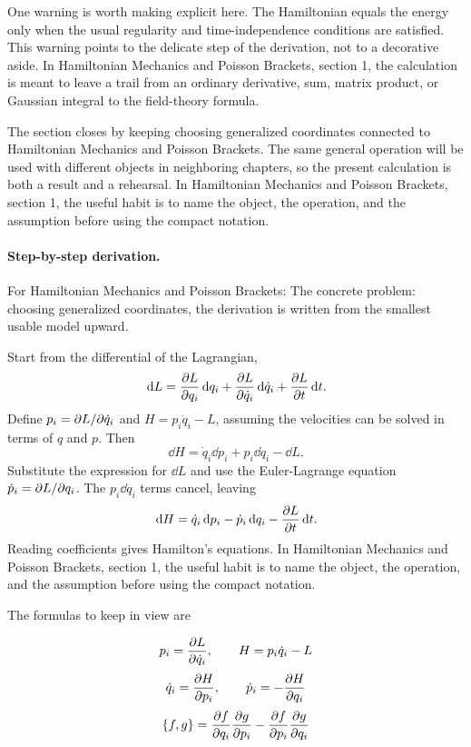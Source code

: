 One warning is worth making explicit here.  The Hamiltonian equals the energy only when the usual regularity and time-independence conditions are satisfied.  This warning points to the delicate step of the derivation, not to a decorative aside.  In Hamiltonian Mechanics and Poisson Brackets, section 1, the calculation is meant to leave a trail from an ordinary derivative, sum, matrix product, or Gaussian integral to the field-theory formula.

The section closes by keeping choosing generalized coordinates connected to Hamiltonian Mechanics and Poisson Brackets.  The same general operation will be used with different objects in neighboring chapters, so the present calculation is both a result and a rehearsal.  In Hamiltonian Mechanics and Poisson Brackets, section 1, the useful habit is to name the object, the operation, and the assumption before using the compact notation.



\paragraph{Step-by-step derivation.}

For Hamiltonian Mechanics and Poisson Brackets: The concrete problem: choosing generalized coordinates, the derivation is written from the smallest usable model upward.

Start from the differential of the Lagrangian,
\[
  \,\mathrm d L=\frac{\partial L}{\partial q_i}\,\mathrm d q_i+\frac{\partial L}{\partial\dot q_i}\,\mathrm d\dot q_i+\frac{\partial L}{\partial t}\,\mathrm d t.
\]
Define \(p_i=\partial L/\partial\dot q_i\) and \(H=p_i\dot q_i-L\), assuming the velocities can be solved in terms of \(q\) and \(p\).  Then
\[
  \dd H=\dot q_i\dd p_i+p_i\dd\dot q_i-\dd L.
\]
Substitute the expression for \(\dd L\) and use the Euler-Lagrange equation \(\dot p_i=\partial L/\partial q_i\).  The \(p_i\dd\dot q_i\) terms cancel, leaving
\[
  \,\mathrm d H=\dot q_i\,\mathrm d p_i-\dot p_i\,\mathrm d q_i-\frac{\partial L}{\partial t}\,\mathrm d t.
\]
Reading coefficients gives Hamilton's equations.  In Hamiltonian Mechanics and Poisson Brackets, section 1, the useful habit is to name the object, the operation, and the assumption before using the compact notation.

The formulas to keep in view are

\[
  p_i=\frac{\partial L}{\partial\dot q_i},\qquad H=p_i\dot q_i-L
\]
\[
  \dot q_i=\frac{\partial H}{\partial p_i},\qquad \dot p_i=-\frac{\partial H}{\partial q_i}
\]
\[
  \{f,g\}=\frac{\partial f}{\partial q_i}\frac{\partial g}{\partial p_i}-\frac{\partial f}{\partial p_i}\frac{\partial g}{\partial q_i}
\]

